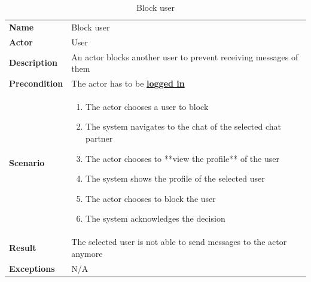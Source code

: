 \begin{table}[ht]
    \caption{Block user}
    \begin{tabular}{|L{5cm}|L{10cm}|}
        \toprule
        \textbf{Name}         & Block user                                                          \\
        \textbf{Actor}        & User                                                                \\
        \textbf{Description}  & An actor blocks another user to prevent receiving messages of them  \\
        \textbf{Precondition} & The actor has to be \textbf{\hyperref[tab:table8]{logged in}}       \\
        \textbf{Scenario} &
        \vspace{-0.75cm}
        \begin{enumerate}
            \setlength\itemsep{-0.5em}
            \item The actor chooses a user to block
            \item The system navigates to the chat of the selected chat partner
            \item The actor chooses to **view the profile** of the user %
            \item The system shows the profile of the selected user
            \item The actor chooses to block the user
            \item The system acknowledges the decision
        \end{enumerate} \\[-0.5cm]
        \textbf{Result}       & The selected user is not able to send messages to the actor anymore \\
        \textbf{Exceptions}   & N/A                                                                 \\
        \bottomrule
    \end{tabular}
    \label{tab:table12}
\end{table}

